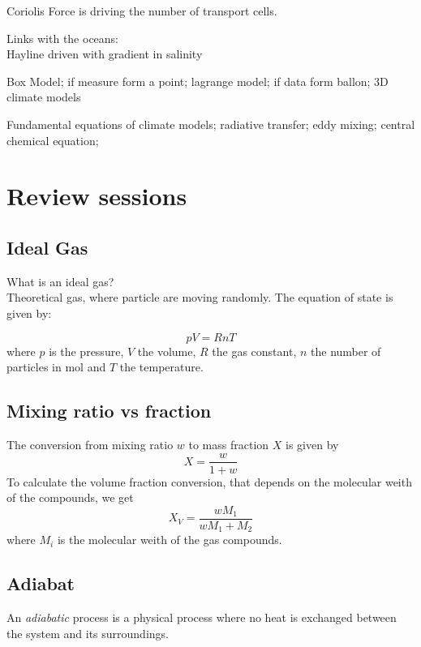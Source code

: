 \documentclass[12pt, a4paper]{article} %
\begin{document}
Coriolis Force is driving the number of transport cells.

Links with the oceans: \\

Hayline driven with gradient in salinity

Box Model; if measure form a point; lagrange model; if data form ballon; 3D climate models

Fundamental equations of climate models; radiative transfer; eddy mixing; central chemical equation;



\section{Review sessions}

\subsection{Ideal Gas}

What is an ideal gas? \\

Theoretical gas, where particle are moving randomly. The equation of state is given by:

\begin{equation}
	pV = RnT
\end{equation}
where $p$ is the pressure, $V$ the volume, $R$ the gas constant, $n$ the number of particles in mol and $T$ the temperature.

\subsection{Mixing ratio vs fraction}

The conversion from mixing ratio $w$ to mass fraction $X$ is given by
\begin{equation}
	X = \frac{w}{1+w}
\end{equation}
To calculate the volume fraction conversion, that depends on the molecular weith of the compounds, we get
\begin{equation}
	X_V = \frac{w M_1}{wM_1 + M_2}
\end{equation}
where $M_i$ is the molecular weith of the gas compounds.

\subsection{Adiabat}

An \emph{adiabatic} process is a physical process where no heat is exchanged between the system and its surroundings. \\
\end{document}
